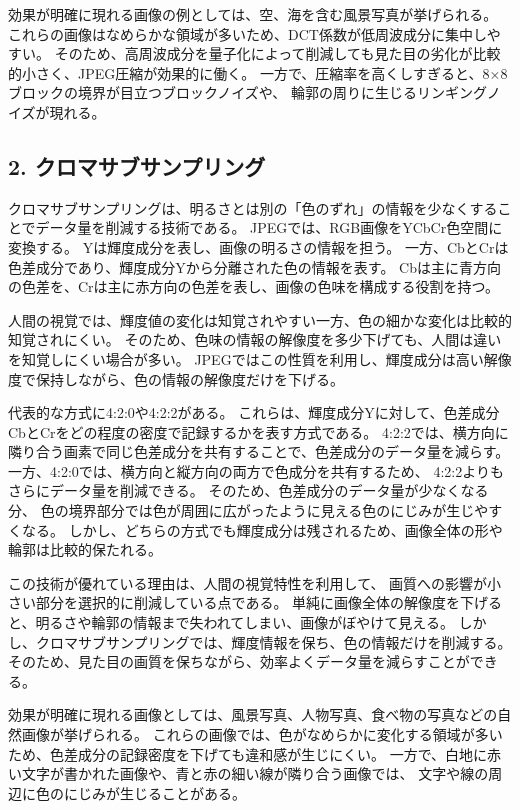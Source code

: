 \documentclass[11pt,a4paper]{ltjsarticle}
\begin{document}
効果が明確に現れる画像の例としては、空、海を含む風景写真が挙げられる。
これらの画像はなめらかな領域が多いため、DCT係数が低周波成分に集中しやすい。
そのため、高周波成分を量子化によって削減しても見た目の劣化が比較的小さく、JPEG圧縮が効果的に働く。
一方で、圧縮率を高くしすぎると、8×8ブロックの境界が目立つブロックノイズや、
輪郭の周りに生じるリンギングノイズが現れる。

\subsection*{2. クロマサブサンプリング}

クロマサブサンプリングは、明るさとは別の「色のずれ」の情報を少なくすることでデータ量を削減する技術である。
JPEGでは、RGB画像をYCbCr色空間に変換する。
Yは輝度成分を表し、画像の明るさの情報を担う。
一方、CbとCrは色差成分であり、輝度成分Yから分離された色の情報を表す。
Cbは主に青方向の色差を、Crは主に赤方向の色差を表し、画像の色味を構成する役割を持つ。

人間の視覚では、輝度値の変化は知覚されやすい一方、色の細かな変化は比較的知覚されにくい。
そのため、色味の情報の解像度を多少下げても、人間は違いを知覚しにくい場合が多い。
JPEGではこの性質を利用し、輝度成分は高い解像度で保持しながら、色の情報の解像度だけを下げる。

代表的な方式に4:2:0や4:2:2がある。
これらは、輝度成分Yに対して、色差成分CbとCrをどの程度の密度で記録するかを表す方式である。
4:2:2では、横方向に隣り合う画素で同じ色差成分を共有することで、色差成分のデータ量を減らす。
一方、4:2:0では、横方向と縦方向の両方で色成分を共有するため、
4:2:2よりもさらにデータ量を削減できる。
そのため、色差成分のデータ量が少なくなる分、
色の境界部分では色が周囲に広がったように見える色のにじみが生じやすくなる。
しかし、どちらの方式でも輝度成分は残されるため、画像全体の形や輪郭は比較的保たれる。

この技術が優れている理由は、人間の視覚特性を利用して、
画質への影響が小さい部分を選択的に削減している点である。
単純に画像全体の解像度を下げると、明るさや輪郭の情報まで失われてしまい、画像がぼやけて見える。
しかし、クロマサブサンプリングでは、輝度情報を保ち、色の情報だけを削減する。
そのため、見た目の画質を保ちながら、効率よくデータ量を減らすことができる。

効果が明確に現れる画像としては、風景写真、人物写真、食べ物の写真などの自然画像が挙げられる。
これらの画像では、色がなめらかに変化する領域が多いため、色差成分の記録密度を下げても違和感が生じにくい。
一方で、白地に赤い文字が書かれた画像や、青と赤の細い線が隣り合う画像では、
文字や線の周辺に色のにじみが生じることがある。
\end{document}
